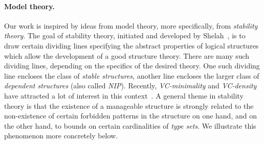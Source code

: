 

%
%
%
%
%
%




\paragraph{Model theory.}Our work is inspired by ideas from model theory,  more specifically, from \emph{stability theory}.
%
  The goal of {stability theory},
  initiated and developed by Shelah~\cite{shelah1990classification},
  is to draw certain dividing lines
  specifying  the abstract properties of 
  logical structures which allow the development 
  of a good structure theory. There are many such dividing lines, depending on the specifics of the desired theory. One such dividing line encloses the class of \emph{stable structures}, another line encloses the larger class of \emph{dependent structures} (also called \emph{NIP}). Recently, \emph{VC-minimality} and \emph{VC-density} have attracted a lot of interest in this context~\cite{aschenbrenner2016vapnik,bobkov2017computations,Guingona2013}.
  A general theme in stability theory is that the existence of a manageable structure is strongly related to
  the non-existence of certain forbidden patterns in the structure on one hand,
and on the other hand, to bounds on certain cardinalities
of \emph{type sets}.  
  We illustrate this phenomenon more concretely below.

